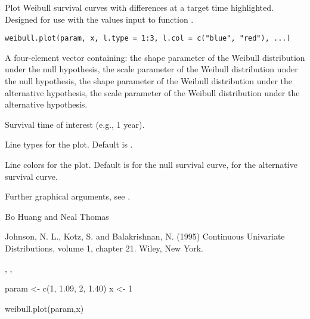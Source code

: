 \begin{Description}\relax
Plot Weibull survival curves with differences at a target time highlighted. Designed for use with the 
values input to function .
\end{Description}
\begin{Usage}
\begin{verbatim}
weibull.plot(param, x, l.type = 1:3, l.col = c("blue", "red"), ...)
\end{verbatim}
\end{Usage}
\begin{Arguments}
\begin{ldescription}
\item[\code{param}] A four-element vector containing: the shape parameter of the Weibull distribution under the
null hypothesis, the scale parameter of the Weibull distribution under the
null hypothesis, the shape parameter of the Weibull distribution under the
alternative hypothesis, the scale parameter of the Weibull distribution under the
alternative hypothesis.
\item[\code{x}] Survival time of interest (e.g., 1 year).
\item[\code{l.type}] Line types for the plot. Default is .
\item[\code{l.col}] Line colors for the plot. Default is  for
the null survival curve,  for the alternative survival curve.
\item[\code{...}] Further graphical arguments, see .
\end{ldescription}
\end{Arguments}
\begin{Author}\relax
Bo Huang  and Neal Thomas
\end{Author}
\begin{References}\relax
Johnson, N. L., Kotz, S. and Balakrishnan, N. (1995) Continuous
Univariate Distributions, volume 1, chapter 21. Wiley, New York.
\end{References}
\begin{SeeAlso}\relax
{}, ,
\end{SeeAlso}
\begin{Examples}
\begin{ExampleCode}
param <- c(1, 1.09, 2, 1.40)
x <- 1

weibull.plot(param,x)

\end{ExampleCode}
\end{Examples}

